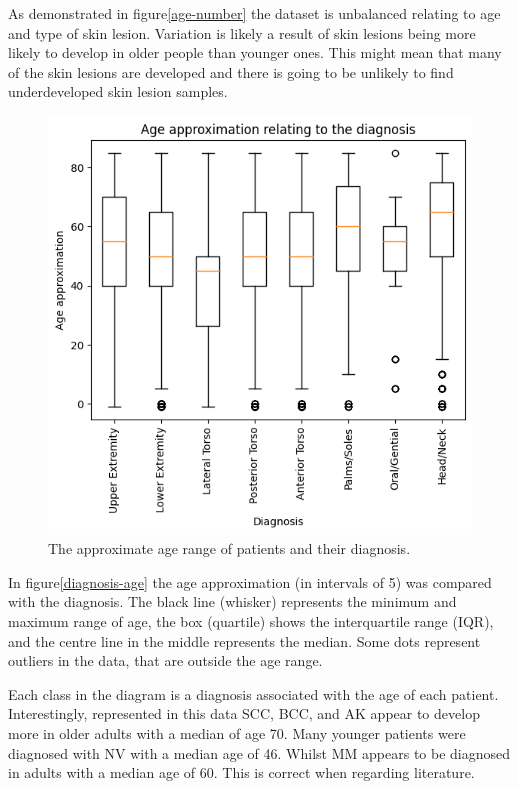 As demonstrated in figure\ref{age-number} the dataset is unbalanced relating to age and type of skin lesion. Variation is likely a result of skin lesions being more likely to develop in older people than younger ones. This might mean that many of the skin lesions are developed and there is going to be unlikely to find underdeveloped skin lesion samples.

\begin{figure}
    \centering
    \includegraphics[scale=0.75]{images/ISIC/diagnosis-age.png}
    \caption{The approximate age range of patients and their diagnosis.} 
\end{figure} \label{diagnosis-age}

In figure\ref{diagnosis-age} the age approximation (in intervals of 5) was compared with the diagnosis. The black line (whisker) represents the minimum and maximum range of age, the box (quartile) shows the interquartile range (IQR), and the centre line in the middle represents the median. Some dots represent outliers in the data, that are outside the age range. 

Each class in the diagram is a diagnosis associated with the age of each patient. Interestingly, represented in this data SCC, BCC, and AK appear to develop more in older adults with a median of age 70. Many younger patients were diagnosed with NV with a median age of 46. Whilst MM appears to be diagnosed in adults with a median age of 60. This is correct when regarding literature\cite{}.


